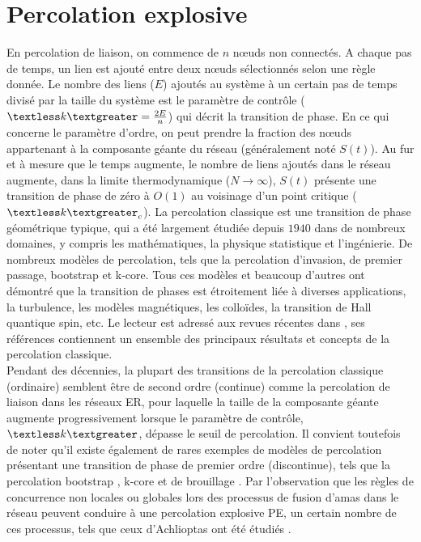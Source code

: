 \section{Percolation explosive}
En percolation de liaison, on commence de $n$ nœuds non connectés. A chaque pas de temps, un lien est ajouté entre deux nœuds sélectionnés selon une règle donnée. Le nombre des liens ($E$) ajoutés au système à un certain pas de temps divisé par la taille du système est le paramètre de contrôle ($\km=\frac{2E}{n}$) qui décrit la transition de phase. En ce qui concerne le paramètre d'ordre, on peut prendre la fraction des nœuds appartenant à la composante géante du réseau (généralement noté $S(t)$). Au fur et à mesure que le temps augmente, le nombre de liens ajoutés dans le réseau augmente, dans la limite thermodynamique ($N\longrightarrow \infty$), $S(t)$ présente une transition de phase de zéro à $O(1)$ au voisinage d'un point critique ($\km_c$). La percolation classique est une transition de phase géométrique typique, qui a été largement étudiée depuis $1940$ dans de nombreux domaines, y compris les mathématiques, la physique statistique et l'ingénierie. De nombreux modèles de percolation, tels que la percolation d'invasion, de premier passage,  bootstrap et k-core. 
Tous ces modèles et beaucoup d'autres ont démontré que la transition de phases est étroitement liée à diverses applications, la turbulence, les modèles magnétiques, les colloïdes, la transition de Hall quantique spin, etc. Le lecteur est adressé aux revues récentes dans \cite{Boccaletti-al2016,Souza-Nagler2015,Araujo-al2014}, ses références contiennent un ensemble des principaux résultats et concepts de la percolation classique.\\

Pendant des décennies, la plupart des transitions de la percolation classique (ordinaire) semblent être de second ordre (continue) comme la percolation de liaison dans les réseaux ER, pour laquelle la taille de la composante géante augmente progressivement lorsque le paramètre de contrôle, $\km$, dépasse le seuil de percolation. Il convient toutefois de noter qu'il existe également de rares exemples de modèles de percolation présentant une transition de phase de premier ordre (discontinue), tels que la percolation bootstrap \cite{Adler1991}, k-core \cite{Dorogovtsev2-2006} et de brouillage \cite{Echenique-al2005}. Par l'observation que les règles de concurrence non locales ou globales lors des processus de fusion d'amas dans le réseau peuvent conduire à une percolation explosive PE, un certain nombre de ces processus, tels que ceux d'Achlioptas ont été étudiés \cite{Costa-al2010,Costa-al2015,Cho-Kahng2011}.

